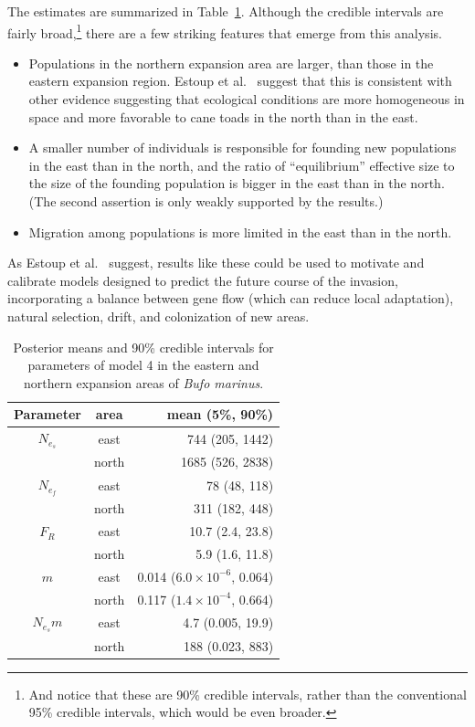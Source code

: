 The estimates are summarized in Table~\ref{table:cane-toad}. Although
the credible intervals are fairly broad,\footnote{And notice that
  these are 90\% credible intervals, rather than the conventional 95\%
  credible intervals, which would be even broader.} there are a few
striking features that emerge from this analysis.

\begin{itemize}

\item Populations in the northern expansion area are larger, than
  those in the eastern expansion region. Estoup et
  al.~\cite{Estoup-etal-2004} suggest that this is consistent with
  other evidence suggesting that ecological conditions are more
  homogeneous in space and more favorable to cane toads in the north
  than in the east.

\item A smaller number of individuals is responsible for founding new
  populations in the east than in the north, and the ratio of
  ``equilibrium'' effective size to the size of the founding
  population is bigger in the east than in the north. (The second
  assertion is only weakly supported by the results.)

\item Migration among populations is more limited in the east than in
  the north. 

\end{itemize}

As Estoup et al.~\cite{Estoup-etal-2004} suggest, results like these
could be used to motivate and calibrate models designed to predict the
future course of the invasion, incorporating a balance between gene
flow (which can reduce local adaptation), natural selection, drift,
and colonization of new areas.

\begin{table}
\begin{center}
\begin{tabular}{ccr}
\hline\hline
Parameter & area & mean (5\%, 90\%) \\
\hline
$N_{e_s}$ & east & 744 (205, 1442) \\
         & north & 1685 (526, 2838) \\
$N_{e_f}$ & east & 78 (48, 118) \\
         & north & 311 (182, 448) \\
$F_R$    & east & 10.7 (2.4, 23.8) \\
         & north & 5.9 (1.6, 11.8) \\
$m$      & east & 0.014 ($6.0 \times 10^{-6}$, 0.064) \\
         & north & 0.117 ($1.4 \times 10^{-4}$, 0.664) \\
$N_{e_s}m$ & east & 4.7 (0.005, 19.9) \\
          & north & 188 (0.023, 883) \\
\hline
\end{tabular}
\end{center}
\caption{Posterior means and 90\% credible intervals for parameters of
  model 4 in the eastern and northern expansion areas of {\it Bufo
    marinus}.}\label{table:cane-toad}
\end{table}

